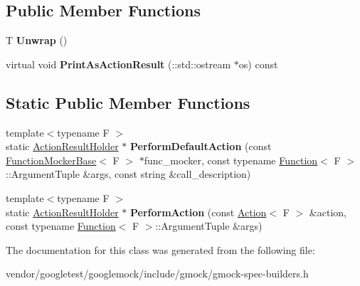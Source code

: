 \subsection*{Public Member Functions}
\begin{DoxyCompactItemize}
\item 
T {\bfseries Unwrap} ()\hypertarget{classtesting_1_1internal_1_1ActionResultHolder_a057df6cceeeab9ea06e679bcf6b78960}{}\label{classtesting_1_1internal_1_1ActionResultHolder_a057df6cceeeab9ea06e679bcf6b78960}

\item 
virtual void {\bfseries Print\+As\+Action\+Result} (\+::std\+::ostream $\ast$os) const \hypertarget{classtesting_1_1internal_1_1ActionResultHolder_a70989192d3ed669c059a7e29c4a7b9fc}{}\label{classtesting_1_1internal_1_1ActionResultHolder_a70989192d3ed669c059a7e29c4a7b9fc}

\end{DoxyCompactItemize}
\subsection*{Static Public Member Functions}
\begin{DoxyCompactItemize}
\item 
{\footnotesize template$<$typename F $>$ }\\static \hyperlink{classtesting_1_1internal_1_1ActionResultHolder}{Action\+Result\+Holder} $\ast$ {\bfseries Perform\+Default\+Action} (const \hyperlink{classtesting_1_1internal_1_1FunctionMockerBase}{Function\+Mocker\+Base}$<$ F $>$ $\ast$func\+\_\+mocker, const typename \hyperlink{structtesting_1_1internal_1_1Function}{Function}$<$ F $>$\+::Argument\+Tuple \&args, const string \&call\+\_\+description)\hypertarget{classtesting_1_1internal_1_1ActionResultHolder_a9609dcb5fb16271f83d777b087075272}{}\label{classtesting_1_1internal_1_1ActionResultHolder_a9609dcb5fb16271f83d777b087075272}

\item 
{\footnotesize template$<$typename F $>$ }\\static \hyperlink{classtesting_1_1internal_1_1ActionResultHolder}{Action\+Result\+Holder} $\ast$ {\bfseries Perform\+Action} (const \hyperlink{classtesting_1_1Action}{Action}$<$ F $>$ \&action, const typename \hyperlink{structtesting_1_1internal_1_1Function}{Function}$<$ F $>$\+::Argument\+Tuple \&args)\hypertarget{classtesting_1_1internal_1_1ActionResultHolder_a9e10aff754b5caf69b14964f3c9c79ec}{}\label{classtesting_1_1internal_1_1ActionResultHolder_a9e10aff754b5caf69b14964f3c9c79ec}

\end{DoxyCompactItemize}


The documentation for this class was generated from the following file\+:\begin{DoxyCompactItemize}
\item 
vendor/googletest/googlemock/include/gmock/gmock-\/spec-\/builders.\+h\end{DoxyCompactItemize}
